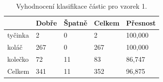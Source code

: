 \documentclass[11pt,twoside,a4paper,table]{book}
\begin{document}
\begin{table}[h!]
\begin{center}
\begin{tabular}{lllll}
\hline
\rowcolor[HTML]{9B9B9B} 
\multicolumn{1}{|l|}{\cellcolor[HTML]{9B9B9B}Třída} & \multicolumn{1}{l|}{\cellcolor[HTML]{9B9B9B}Dobře} & \multicolumn{1}{l|}{\cellcolor[HTML]{9B9B9B}Špatně} & \multicolumn{1}{l|}{\cellcolor[HTML]{9B9B9B}Celkem} & \multicolumn{1}{l|}{\cellcolor[HTML]{9B9B9B}Přesnost} \\ \hline
\multicolumn{1}{|l|}{tyčinka}                             & \multicolumn{1}{l|}{2}                             & \multicolumn{1}{l|}{0}                               & \multicolumn{1}{l|}{2}                              & \multicolumn{1}{l|}{100,000}                          \\ \hline
\multicolumn{1}{|l|}{koláč}                             & \multicolumn{1}{l|}{267}                           & \multicolumn{1}{l|}{0}                               & \multicolumn{1}{l|}{267}                            & \multicolumn{1}{l|}{100,000}                          \\ \hline
\multicolumn{1}{|l|}{kolečko}                             & \multicolumn{1}{l|}{72}                            & \multicolumn{1}{l|}{11}                              & \multicolumn{1}{l|}{83}                             & \multicolumn{1}{l|}{86,747}                           \\ \hline
\multicolumn{1}{|l|}{Celkem}                        & \multicolumn{1}{l|}{341}                           & \multicolumn{1}{l|}{11}                              & \multicolumn{1}{l|}{352}                            & \multicolumn{1}{l|}{96,875}                           \\ \hline
\end{tabular}
\end{center}
\caption{Vyhodnocení klasifikace částic pro vzorek 1.}
\label{tab:classresult1}
\end{table}

\newpage
\FloatBarrier
\end{document}
